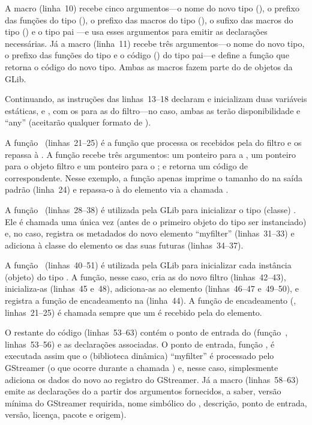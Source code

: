 \documentclass{SBCbookchapter}
\begin{document}
A macro  (linha~10) recebe cinco argumentos---o
nome do novo tipo (), o prefixo das funções do tipo
(), o prefixo das macros do tipo (), o sufixo das
macros do tipo () e o tipo pai ---e usa esses
argumentos para emitir as declarações necessárias.  Já a macro
 (linha~11) recebe três argumentos---o nome do novo tipo,
o prefixo das funções do tipo e o código () do tipo pai---e define
a função  que retorna o código  do novo
tipo.  Ambas as macros fazem parte do  de objetos da GLib.

Continuando, as instruções das linhas~13--18 declaram e inicializam duas
variáveis estáticas,  e , com os
 para as  do filtro---no caso, ambas as 
terão disponibilidade  e  ``any'' (aceitarão qualquer
formato de ).

A função~ (linhas~21--25) é a função que processa os
 recebidos pela  do filtro e os repassa à
.  A função recebe três argumentos: um ponteiro para a
, um ponteiro para o objeto filtro e um ponteiro para o
; e retorna um código de  correspondente.  Nesse
exemplo, a função apenas imprime o tamanho do  na saída padrão
(linha~24) e repassa-o à  do elemento via a chamada
.

A função~ (linhas~28--38) é utilizada pela GLib
para inicializar o tipo (classe) .  Ele é chamada uma única
vez (antes de o primeiro objeto do tipo ser instanciado) e, no caso,
registra os metadados do novo elemento ``myfilter'' (linhas~31--33) e
adiciona à classe do elemento os  das suas futuras 
(linhas~34--37).

A função~ (linhas~40--51) é utilizada pela GLib para
inicializar cada instância (objeto) do tipo .  A função,
nesse caso, cria as  do novo filtro (linhas~42--43), inicializa-as
(linhas~45 e~48), adiciona-as ao elemento (linhas~46--47 e~49--50), e
registra a função de encadeamento na  (linha~44).  A função de
encadeamento (, linhas~21--25) é chamada sempre que
um  é recebido pela  do elemento.

O restante do código (linhas~53--63) contém o ponto de entrada do
 (função~, linhas~53--56) e as
declarações associadas.  O ponto de entrada, função
, é executada assim que o  (biblioteca
dinâmica) ``myfilter'' é processado pelo GStreamer (o que ocorre durante a
chamada ) e, nesse caso, simplesmente adiciona os dados do novo
 ao registro do GStreamer.  Já a macro 
(linhas~58--63) emite as declarações do  a partir dos argumentos
fornecidos, a saber, versão mínima do GStreamer requirida, nome simbólico do
, descrição, ponto de entrada, versão, licença, pacote e origem).
\end{document}
